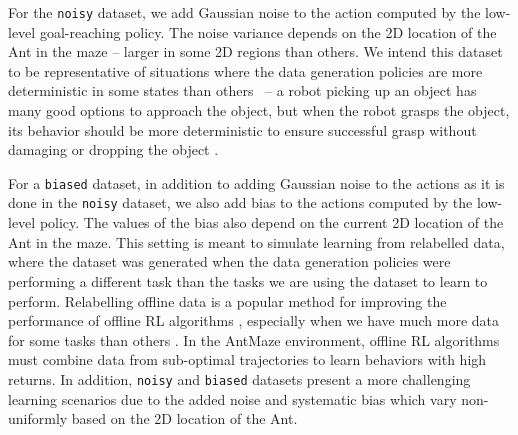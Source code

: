 For the \texttt{noisy}
dataset, we add Gaussian noise to the action computed by the low-level goal-reaching policy. The noise variance depends on the 2D location of the Ant in the maze -- larger in some 2D regions than others. We intend this dataset to be representative of situations where the data generation policies are more deterministic in some states than others~\cite{kumar2022prefer} -- a robot picking up an object has many good options to approach the object, but when the robot grasps the object, its behavior should be more deterministic to ensure successful grasp without damaging or dropping the object \cite{10.5555/561828}.

For a \texttt{biased} dataset, in addition to adding Gaussian noise to the actions as it is done in the \texttt{noisy} dataset, we also add  bias to the actions computed by the low-level policy. The values of the bias also depend on the current 2D location of the Ant in the maze. This setting is meant to simulate learning from relabelled data, where the dataset was generated when the data generation policies were performing a different task than the tasks we are using the dataset to learn to perform. Relabelling offline data is a popular method for improving the performance of offline RL algorithms \cite{MBRL, Snell2022}, especially when we have much more data for some tasks than others \cite{mtopt}.
In the AntMaze environment, offline RL algorithms must combine data from sub-optimal trajectories to learn behaviors with high returns. In addition, \texttt{noisy} and \texttt{biased} datasets present a more challenging learning scenarios due to the added noise and systematic bias which vary non-uniformly based on the 2D location of the Ant.

